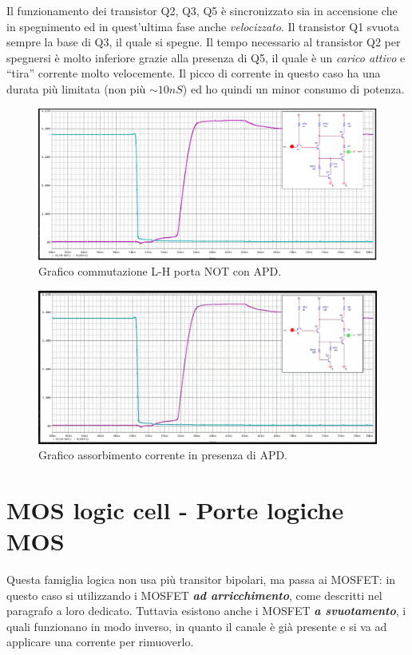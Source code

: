 \documentclass[
]{book}
\begin{document}
Il funzionamento dei transistor Q2, Q3, Q5 è sincronizzato sia in
accensione che in spegnimento ed in quest'ultima fase anche
\emph{velocizzato}. Il transistor Q1 svuota sempre la base di Q3, il
quale si spegne. Il tempo necessario al transistor Q2 per spegnersi è
molto inferiore grazie alla presenza di Q5, il quale è un \emph{carico
attivo} e ``tira'' corrente molto velocemente. \newline Il picco di
corrente in questo caso ha una durata più limitata (non più
\(\sim 10nS\)) ed ho quindi un minor consumo di potenza.

\begin{figure}
\centering
\includegraphics[width=0.6\linewidth,height=\textheight,keepaspectratio]{assets/imgs/commutazione_l_h_apd.png}
\caption{Grafico commutazione L-H porta NOT con APD.}
\end{figure}

\begin{figure}
\centering
\includegraphics[width=0.6\linewidth,height=\textheight,keepaspectratio]{assets/imgs/corrente_apd.png}
\caption{Grafico assorbimento corrente in presenza di APD.}
\end{figure}

\section{MOS logic cell - Porte logiche
MOS}\label{mos-logic-cell---porte-logiche-mos}

Questa famiglia logica non usa più transitor bipolari, ma passa ai
MOSFET: in questo caso si utilizzando i MOSFET \textbf{\emph{ad
arricchimento}}, come descritti nel paragrafo a loro dedicato. Tuttavia
esistono anche i MOSFET \textbf{\emph{a svuotamento}}, i quali
funzionano in modo inverso, in quanto il canale è già presente e si va
ad applicare una corrente per rimuoverlo.
\end{document}
